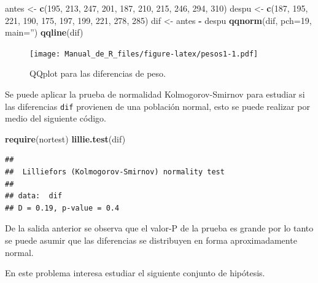 \documentclass[10pt,]{krantz}
\makeatletter
\newenvironment{Shaded}{\begin{snugshade}}{\end{snugshade}}
\newcommand{\KeywordTok}[1]{\textcolor[rgb]{0.13,0.29,0.53}{\textbf{#1}}}
\newcommand{\DataTypeTok}[1]{\textcolor[rgb]{0.13,0.29,0.53}{#1}}
\newcommand{\DecValTok}[1]{\textcolor[rgb]{0.00,0.00,0.81}{#1}}
\newcommand{\StringTok}[1]{\textcolor[rgb]{0.31,0.60,0.02}{#1}}
\newcommand{\OperatorTok}[1]{\textcolor[rgb]{0.81,0.36,0.00}{\textbf{#1}}}
\newcommand{\NormalTok}[1]{#1}
\newenvironment{kframe}{%
\medskip{}
\setlength{\fboxsep}{.8em}
 \def\at@end@of@kframe{}%
 \ifinner\ifhmode%
  \def\at@end@of@kframe{\end{minipage}}%
  \begin{minipage}{\columnwidth}%
 \fi\fi%
 \def\FrameCommand##1{\hskip\@totalleftmargin \hskip-\fboxsep
 \colorbox{shadecolor}{##1}\hskip-\fboxsep
     \hskip-\linewidth \hskip-\@totalleftmargin \hskip\columnwidth}%
 \MakeFramed {\advance\hsize-\width
   \@totalleftmargin\z@ \linewidth\hsize
   \@setminipage}}%
 {\par\unskip\endMakeFramed%
 \at@end@of@kframe}
\renewenvironment{Shaded}{\begin{kframe}}{\end{kframe}}
\makeatother
\begin{document}
\begin{Shaded}
\begin{Highlighting}[]
\NormalTok{antes <-}\StringTok{ }\KeywordTok{c}\NormalTok{(}\DecValTok{195}\NormalTok{, }\DecValTok{213}\NormalTok{, }\DecValTok{247}\NormalTok{, }\DecValTok{201}\NormalTok{, }\DecValTok{187}\NormalTok{, }\DecValTok{210}\NormalTok{, }\DecValTok{215}\NormalTok{, }\DecValTok{246}\NormalTok{, }\DecValTok{294}\NormalTok{, }\DecValTok{310}\NormalTok{)}
\NormalTok{despu <-}\StringTok{ }\KeywordTok{c}\NormalTok{(}\DecValTok{187}\NormalTok{, }\DecValTok{195}\NormalTok{, }\DecValTok{221}\NormalTok{, }\DecValTok{190}\NormalTok{, }\DecValTok{175}\NormalTok{, }\DecValTok{197}\NormalTok{, }\DecValTok{199}\NormalTok{, }\DecValTok{221}\NormalTok{, }\DecValTok{278}\NormalTok{, }\DecValTok{285}\NormalTok{)}
\NormalTok{dif <-}\StringTok{ }\NormalTok{antes }\OperatorTok{-}\StringTok{ }\NormalTok{despu}
\KeywordTok{qqnorm}\NormalTok{(dif, }\DataTypeTok{pch=}\DecValTok{19}\NormalTok{, }\DataTypeTok{main=}\StringTok{''}\NormalTok{)}
\KeywordTok{qqline}\NormalTok{(dif)}
\end{Highlighting}
\end{Shaded}

\begin{figure}
\centering
\texttt{[image: Manual\_de\_R\_files/figure-latex/pesos1-1.pdf]}
\caption{\label{fig:pesos1}QQplot para las diferencias de peso.}
\end{figure}

Se puede aplicar la prueba de normalidad Kolmogorov-Smirnov para
estudiar si las diferencias \texttt{dif} provienen de una población
normal, esto se puede realizar por medio del siguiente código.

\begin{Shaded}
\begin{Highlighting}[]
\KeywordTok{require}\NormalTok{(nortest)}
\KeywordTok{lillie.test}\NormalTok{(dif)}
\end{Highlighting}
\end{Shaded}

\begin{verbatim}
## 
##  Lilliefors (Kolmogorov-Smirnov) normality test
## 
## data:  dif
## D = 0.19, p-value = 0.4
\end{verbatim}

De la salida anterior se observa que el valor-P de la prueba es grande
por lo tanto se puede asumir que las diferencias se distribuyen en forma
aproximadamente normal.

En este problema interesa estudiar el siguiente conjunto de hipótesis.
\end{document}
